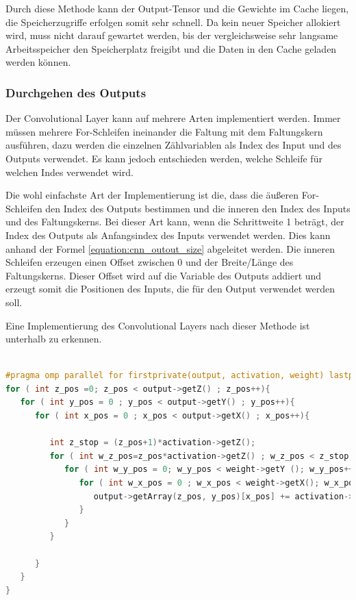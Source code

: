\documentclass[../main.tex]{subfiles}
\begin{document}
Durch diese Methode kann der Output-Tensor und die Gewichte im Cache liegen, die Speicherzugriffe erfolgen somit sehr schnell. Da kein neuer Speicher allokiert wird, muss nicht darauf gewartet werden, bis der vergleichsweise sehr langsame Arbeitsspeicher den Speicherplatz freigibt und die Daten in den Cache geladen werden können. 

\subsubsection{Durchgehen des Outputs}

Der Convolutional Layer kann auf mehrere Arten implementiert werden. Immer müssen mehrere For-Schleifen ineinander die Faltung mit dem Faltungskern ausführen, dazu werden die einzelnen Zählvariablen als Index des Input und des Outputs verwendet. Es kann jedoch entschieden werden, welche Schleife für welchen Indes verwendet wird.

Die wohl einfachste Art der Implementierung ist die, dass die äußeren For-Schleifen den Index des Outputs bestimmen und die inneren den Index des Inputs und des Faltungskerns. Bei dieser Art kann, wenn die Schrittweite 1 beträgt, der Index des Outputs als Anfangsindex des Inputs verwendet werden. Dies kann anhand der Formel \ref{equation:cnn_outout_size} abgeleitet werden. Die inneren Schleifen erzeugen einen Offset zwischen 0 und der Breite/Länge des Faltungskerns. Dieser Offset wird auf die Variable des Outputs addiert und erzeugt somit die Positionen des Inputs, die für den Output verwendet werden soll.

Eine Implementierung des Convolutional Layers nach dieser Methode ist unterhalb zu erkennen.
\begin{lstlisting}[language=c++, caption=Convolution: Output durchgehen, captionpos=b, label=listing:conv_output, frame=single, linewidth=\textwidth, breaklines=true]

#pragma omp parallel for firstprivate(output, activation, weight) lastprivate(output, activation, weight)
for ( int z_pos =0; z_pos < output->getZ() ; z_pos++){
   for ( int y_pos = 0 ; y_pos < output->getY() ; y_pos++){
      for ( int x_pos = 0 ; x_pos < output->getX() ; x_pos++){
         
         int z_stop = (z_pos+1)*activation->getZ();
         for ( int w_z_pos=z_pos*activation->getZ() ; w_z_pos < z_stop; w_z_pos++){
            for ( int w_y_pos = 0; w_y_pos < weight->getY (); w_y_pos++){
               for ( int w_x_pos = 0 ; w_x_pos < weight->getX(); w_x_pos++){
                  output->getArray(z_pos, y_pos)[x_pos] += activation->getArray(z_pos%activation->getZ(), y_pos+w_y_pos)[x_pos+w_x_pos] * weight->getArray(w_z_pos, w_y_pos )[w_x_pos] ;
               }
            }
         }
      
      }
   }
}
\end{lstlisting}
\end{document}
